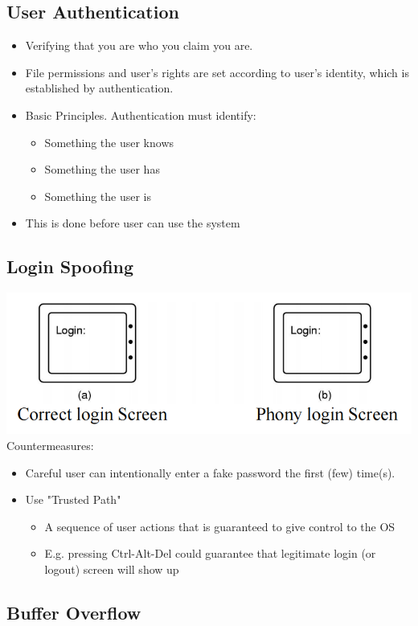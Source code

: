 \documentclass[12pt]{article}
\begin{document}
\subsection{User Authentication}
\begin{itemize}
    \item Verifying that you are who you claim you are.
    \item File permissions and user's rights are set according to user's identity, which is established by authentication.
    \item Basic Principles. Authentication must identify: \begin{itemize}
        \item Something the user knows
        \item Something the user has
        \item Something the user is
    \end{itemize}
    \item This is done before user can use the system
\end{itemize}
\subsection{Login Spoofing}
\includegraphics[width=\textwidth]{LoginSpoofing.png}
Countermeasures:
\begin{itemize}
    \item Careful user can intentionally enter a fake password the first (few) time(s).
    \item Use "Trusted Path" \begin{itemize}
        \item A sequence of user actions that is guaranteed to give control to the OS
        \item E.g. pressing Ctrl-Alt-Del could guarantee that legitimate login (or logout) screen will show up
    \end{itemize}
\end{itemize}
\subsection{Buffer Overflow}
\end{document}
